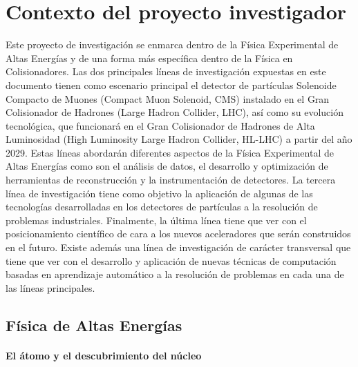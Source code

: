 \section{Contexto del proyecto investigador}

Este proyecto de investigación se enmarca dentro de la Física Experimental de Altas Energías y de una forma más específica dentro de la Física en Colisionadores. Las dos principales líneas de investigación expuestas en este documento tienen como escenario principal el detector de partículas Solenoide Compacto de Muones (Compact Muon Solenoid, CMS) instalado en el Gran Colisionador de Hadrones (Large Hadron Collider, LHC), así como su evolución tecnológica, que funcionará en el Gran Colisionador de Hadrones de Alta Luminosidad (High Luminosity Large Hadron Collider, HL-LHC) a partir del año 2029. Estas líneas abordarán diferentes aspectos de la Física Experimental de Altas Energías como son el análisis de datos, el desarrollo y optimización de herramientas de reconstrucción y la instrumentación de detectores. La tercera línea de investigación tiene como objetivo la aplicación de algunas de las tecnologías desarrolladas en los detectores de partículas a la resolución de problemas industriales. Finalmente, la última línea tiene que ver con el posicionamiento científico de cara a los nuevos aceleradores que serán construidos en el futuro. Existe además una línea de investigación de carácter transversal que tiene que ver con el desarrollo y aplicación de nuevas técnicas de computación basadas en aprendizaje automático a la resolución de problemas en cada una de las líneas principales. 

\subsection{Física de Altas Energías}


\paragraph{El átomo y el descubrimiento del núcleo\\\\}

